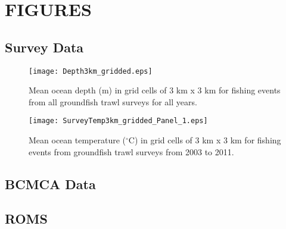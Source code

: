 \documentclass[11pt]{book}\usepackage[]{graphicx}\usepackage[]{color}
\begin{document}
\newpage


\section{FIGURES}
\subsection{Survey Data}

\newpage
\graphicspath{ {c:/GitHub/SPERA-Maps/Results/Figures/} }
\begin{figure}[!htp]
\begin{center}
\texttt{[image: Depth3km\_gridded.eps]}
\end{center}
\caption{Mean ocean depth (m) in grid cells of 3 km x 3 km for fishing events from all groundfish trawl surveys for all years.}
\label{fig:allsurveysdepth}
\end{figure}

\newpage

\graphicspath{ {c:/GitHub/SPERA-Maps/Results/Figures/} }
\begin{figure}[!htp]
\begin{center}
\texttt{[image: SurveyTemp3km\_gridded\_Panel\_1.eps]}
\end{center}
\caption{Mean ocean temperature ($^\circ$C) in grid cells of 3 km x 3 km for fishing events from groundfish trawl surveys from 2003 to 2011.}
\label{fig:survtemppanel}
\end{figure}

\newpage

\subsection{BCMCA Data}


\subsection{ROMS}
\end{document}
